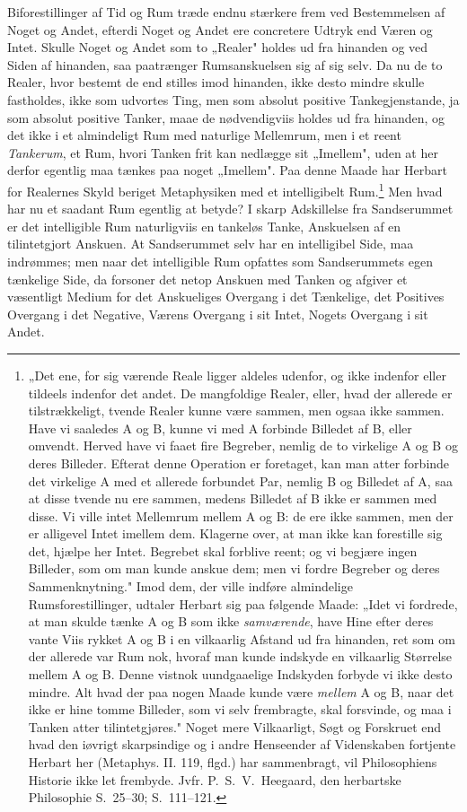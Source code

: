 \documentclass[12pt]{book}
\newcommand{\opage}[1]{\marginnote{\footnotesize\textit{[#1]}}}
\begin{document}
Biforestillinger af Tid og Rum træde endnu stærkere frem ved Bestemmelsen af Noget og
Andet, efterdi Noget og Andet ere concretere Udtryk end Væren og Intet. Skulle Noget
og Andet som to „Realer" holdes ud fra hinanden og ved Siden af hinanden, saa
paatrænger Rumsanskuelsen sig af sig selv. Da nu de to Realer, hvor bestemt de end
stilles imod hinanden, ikke desto mindre skulle fastholdes, ikke som udvortes Ting,
men som absolut positive Tankegjenstande, ja som absolut positive Tanker, maae de
nødvendigviis holdes ud fra hinanden, og det ikke i et almindeligt Rum med naturlige
Mellemrum, men i et reent \emph{Tankerum}, et Rum, hvori Tanken frit kan nedlægge sit
„Imellem", uden at her derfor egentlig maa tænkes paa noget „Imellem". Paa denne Maade
har Herbart for Realernes Skyld beriget Metaphysiken med et intelligibelt
Rum.\footnote{„Det ene, for sig værende Reale ligger aldeles udenfor, og ikke indenfor
eller tildeels indenfor det andet. De mangfoldige Realer, eller, hvad der allerede er
tilstrækkeligt, tvende Realer kunne være sammen, men ogsaa ikke sammen. Have vi
saaledes A og B, kunne vi med A forbinde Billedet af B, eller omvendt. Herved have vi
faaet fire Begreber, nemlig de to virkelige A og B og deres Billeder. Efterat denne
Operation er foretaget, kan man atter forbinde det virkelige A med et allerede
forbundet Par, nemlig B og Billedet af A, saa at disse tvende nu ere sammen, medens
Billedet af B ikke er sammen med disse. Vi ville intet Mellemrum mellem A og B: de ere
ikke sammen, men der er alligevel Intet imellem dem. Klagerne over, at man ikke kan
forestille sig det, hjælpe her Intet. Begrebet skal forblive reent; og vi begjære
ingen Billeder, som om man kunde anskue dem; men vi fordre Begreber og deres
Sammenknytning." Imod dem, der ville indføre almindelige Rumsforestillinger, udtaler
Herbart sig paa følgende Maade: „Idet vi fordrede, at man skulde tænke A og B som ikke
\emph{samværende}, have Hine efter deres vante Viis rykket A og B i en vilkaarlig
Afstand ud fra hinanden, ret som om der allerede var Rum nok, hvoraf man kunde indskyde
en vilkaarlig Størrelse mellem A og B. Denne vistnok uundgaaelige Indskyden forbyde vi
ikke desto mindre. Alt hvad der paa nogen Maade kunde være \emph{mellem} A og B, naar
det ikke er hine tomme Billeder, som vi selv frembragte, skal forsvinde, og maa i
Tanken atter tilintetgjøres." Noget mere Vilkaarligt, Søgt og Forskruet end hvad den
iøvrigt skarpsindige og i andre Henseender af Videnskaben fortjente Herbart her
(Metaphys. II. 119, flgd.) har sammenbragt, vil Philosophiens Historie ikke let
frembyde. Jvfr. P.\ S.\ V.\ Heegaard, den herbartske Philosophie S.~25--30; S.~111--121.}
\opage{20} Men hvad har nu et saadant Rum egentlig at betyde? I skarp Adskillelse fra
Sandserummet er det intelligible Rum naturligviis en tankeløs Tanke, Anskuelsen af en
tilintetgjort Anskuen. At Sandserummet selv har en intelligibel Side, maa indrømmes;
men naar det intelligible Rum opfattes som Sandserummets egen tænkelige Side, da
forsoner det netop Anskuen med Tanken og afgiver et væsentligt Medium for det
Anskueliges Overgang i det Tænkelige, det Positives Overgang i det Negative, Værens
Overgang i sit Intet, Nogets Overgang i sit Andet.
\end{document}

